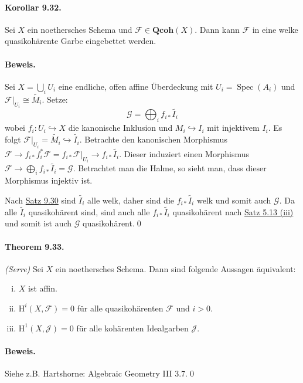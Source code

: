 \paragraph{Korollar 9.32.}\label{9.32} Sei $X$ ein noethersches Schema und $\mathcal{F}\in\mathbf{Qcoh}(X)$. Dann kann $\mathcal{F}$ in eine welke quasikohärente Garbe eingebettet werden.

\paragraph{Beweis.} Sei $X=\bigcup_i U_i$ eine endliche, offen affine Überdeckung mit $U_i=\operatorname{Spec}(A_i)$ und $\mathcal{F}|_{U_i}\cong\widetilde{M_i}$. Setze:
\[\mathcal{G} =\bigoplus_i f_{i\ast}\widetilde{I_i} \]
wobei $f_i:U_i\hookrightarrow X$ die kanonische Inklusion und $M_i\hookrightarrow I_i$ mit injektivem $I_i$. Es folgt $\mathcal{F}|_{U_i}=\widetilde{M_i} \hookrightarrow\widetilde{I_i}$. Betrachte den kanonischen Morphismus $\mathcal{F}\to f_{i\ast}f_i^\ast\mathcal{F}=f_{i\ast}\mathcal{F}|_{U_i}\to f_{i\ast}\widetilde{I_i}$. Dieser induziert einen Morphismus $\mathcal{F}\to\bigoplus_i f_{i\ast}\widetilde{I_i}=\mathcal{G}$. Betrachtet man die Halme, so sieht man, dass dieser Morphismus injektiv ist.

Nach \hyperref[9.30]{Satz 9.30} sind $\widetilde{I_i}$ alle welk, daher sind die $f_{i\ast}\widetilde{I_i}$ welk und somit auch $\mathcal{G}$. Da alle $\widetilde{I_i}$ quasikohärent sind, sind auch alle $f_{i\ast}\widetilde{I_i}$ quasikohärent nach \hyperref[5.13]{Satz 5.13 (iii)} und somit ist auch $\mathcal{G}$ quasikohärent.\qed

\paragraph{Theorem 9.33.}\label{9.33} \textit{(Serre)} Sei $X$ ein noethersches Schema. Dann sind folgende Aussagen äquivalent:
\begin{enumerate}[(i)]
\item $X$ ist affin.
\item $\mathrm{H}^i(X,\mathcal{F})=0$ für alle quasikohärenten $\mathcal{F}$ und $i>0$.
\item $\mathrm{H}^1(X,\mathcal{J})=0$ für alle kohärenten Idealgarben $\mathcal{J}$.
\end{enumerate}

\paragraph{Beweis.} Siehe z.B. Hartshorne: Algebraic Geometry III 3.7.\qed

